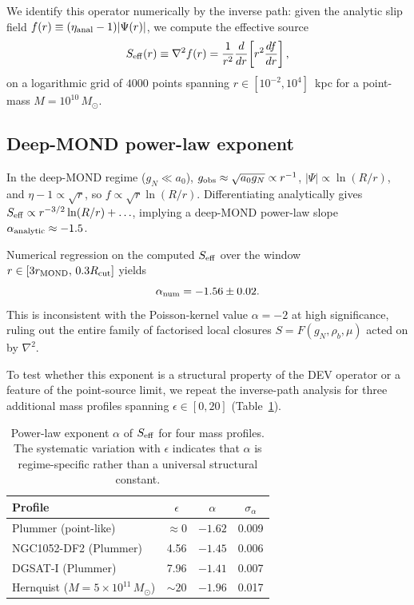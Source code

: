 \documentclass[aps,prd,twocolumn,superscriptaddress,nofootinbib]{revtex4-2}
\newcommand{\aO}{a_0}
\begin{document}
We identify this operator numerically by the inverse path:
given the analytic slip field
$f(r) \equiv (\eta_{\rm anal}-1)|\Psi(r)|$,
we compute the effective source
\begin{equation}
S_{\rm eff}(r) \equiv \nabla^2 f(r)
= \frac{1}{r^2}\frac{d}{dr}\!\left[r^2\frac{df}{dr}\right],
\label{eq:Seff}
\end{equation}
on a logarithmic grid of $4000$ points spanning
$r\in[10^{-2},10^4]$~kpc for a point-mass
$M=10^{10}\,M_\odot$.

\subsection{Deep-MOND power-law exponent}

In the deep-MOND regime ($g_N\ll\aO$),
$g_{\rm obs}\approx\sqrt{\aO g_N}\propto r^{-1}$,
$|\Psi|\propto\ln(R/r)$, and $\eta-1\propto\sqrt{r}$,
so $f\propto\sqrt{r}\ln(R/r)$.
Differentiating analytically gives
$S_{\rm eff}\propto r^{-3/2}\ln(R/r)+\ldots$,
implying a deep-MOND power-law slope
$\alpha_{\rm analytic}\approx-1.5$.

Numerical regression on the computed $S_{\rm eff}$
over the window $r\in[3r_{\rm MOND},\,0.3R_{\rm cut}]$
yields
\begin{equation}
\alpha_{\rm num} = -1.56\pm0.02.
\end{equation}
This is inconsistent with the Poisson-kernel value
$\alpha=-2$ at high significance, ruling out the
entire family of factorised local closures
$S=F(g_N,\rho_b,\mu)$ acted on by $\nabla^2$.

To test whether this exponent is a structural property
of the DEV operator or a feature of the point-source
limit, we repeat the inverse-path analysis for three
additional mass profiles spanning $\epsilon \in [0, 20]$
(Table~\ref{tab:alpha_universality}).

\begin{table}[h]
\caption{Power-law exponent $\alpha$ of $S_{\rm eff}$
for four mass profiles. The systematic variation with
$\epsilon$ indicates that $\alpha$ is regime-specific
rather than a universal structural constant.}
\label{tab:alpha_universality}
\begin{ruledtabular}
\begin{tabular}{lccc}
Profile & $\epsilon$ & $\alpha$ & $\sigma_\alpha$ \\
\hline
Plummer (point-like) & $\approx 0$ & $-1.62$ & 0.009 \\
NGC1052-DF2 (Plummer) & 4.56 & $-1.45$ & 0.006 \\
DGSAT-I (Plummer) & 7.96 & $-1.41$ & 0.007 \\
Hernquist ($M=5\times10^{11}\,M_\odot$) & $\sim 20$
    & $-1.96$ & 0.017 \\
\end{tabular}
\end{ruledtabular}
\end{table}
\end{document}

